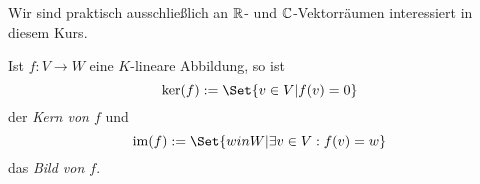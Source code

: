 \begin{remark}
Wir sind praktisch ausschließlich an $\mathbb{R}$- und $\mathbb{C}$-Vektorräumen interessiert in diesem Kurs.
\end{remark}

\begin{definition}
Ist $f: V\to W$ eine $K$-lineare Abbildung, so ist
\[\ker(f) := \Set{v\in V | f(v)=0}\]
der \emph{Kern von $f$} und
\[\im(f) := \Set{win W | \exists v\in V: f(v)=w}\]
das \emph{Bild von $f$}.
\end{definition}